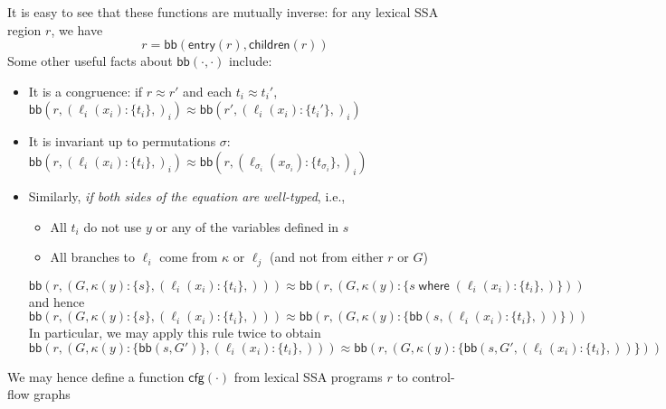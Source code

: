 \documentclass[acmsmall,screen,review]{acmart}
\newcommand{\ms}[1]{\ensuremath{\mathsf{#1}}}
\newcommand{\lto}{:}
\newcommand{\where}[2]{#1\;\ms{where}\;#2}
\newcommand{\wbranch}[3]{#1(#2) \lto \{#3\}}
\newcommand{\teqv}{\approx}
\newcommand{\toentry}[1]{\ms{entry}(#1)}
\newcommand{\todom}[1]{\ms{children}(#1)}
\newcommand{\tocfg}[1]{\ms{cfg}(#1)}
\newcommand{\adddom}[2]{\ms{bb}(#1, #2)}
\begin{document}
It is easy to see that these functions are mutually inverse: for any lexical SSA region $r$, we have
\begin{equation}
  r = \adddom{\toentry{r}}{\todom{r}}
\end{equation}
Some other useful facts about $\adddom{\cdot}{\cdot}$ include:
\begin{itemize}
  \item It is a congruence: if $r \teqv r'$ and each $t_i \teqv t_i'$,
  $\adddom{r}{(\wbranch{\ell_i}{x_i}{t_i},)_i} \teqv \adddom{r'}{(\wbranch{\ell_i}{x_i}{t_i'},)_i}$
  \item It is invariant up to permutations
  $\sigma$: $\adddom{r}{(\wbranch{\ell_i}{x_i}{t_i},)_i} \teqv 
    \adddom{r}{(\wbranch{\ell_{\sigma_i}}{x_{\sigma_i}}{t_{\sigma_i}},)_i}$
  \item Similarly, \emph{if both sides of the equation are well-typed}, i.e.,
  \begin{itemize}
    \item All $t_i$ do not use $y$ or any of the variables defined in $s$
    \item All branches to $\ell_i$ come from $\kappa$ or $\ell_j$ (and not from either $r$ or $G$)
  \end{itemize}
  \begin{equation}
    \adddom{r}{(G, \wbranch{\kappa}{y}{s}, (\wbranch{\ell_i}{x_i}{t_i},))} \teqv
    \adddom{r}{(G, \wbranch{\kappa}{y}{\where{s}{(\wbranch{\ell_i}{x_i}{t_i},)}})}
  \end{equation} 
  and hence
  \begin{equation}
    \adddom{r}{(G, \wbranch{\kappa}{y}{s}, (\wbranch{\ell_i}{x_i}{t_i},))} \teqv
    \adddom{r}{(G, \wbranch{\kappa}{y}{\adddom{s}{(\wbranch{\ell_i}{x_i}{t_i},)}})}
  \end{equation}
  In particular, we may apply this rule twice to obtain
  \begin{equation}
    \adddom{r}{(G, \wbranch{\kappa}{y}{\adddom{s}{G'}}, (\wbranch{\ell_i}{x_i}{t_i},))} \teqv
    \adddom{r}{(G, \wbranch{\kappa}{y}{\adddom{s}{G', (\wbranch{\ell_i}{x_i}{t_i},)}})}
    \label{eqn:pull-where}
  \end{equation}
\end{itemize}
We may hence define a function $\tocfg{\cdot}$ from lexical SSA programs $r$ to control-flow graphs
\end{document}
